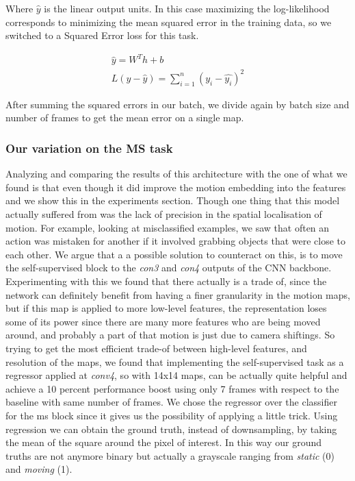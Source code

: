 \documentclass[10pt,twocolumn,hidelinks,letterpaper]{article}
\begin{document}
Where $\hat{y}$ is the linear output units. In this case maximizing the log-likelihood corresponds to minimizing the mean squared error in the training data, so we switched to a Squared Error loss for this task.

\begin{align*}
\hat{y} = W^Th + b\\
L(y - \hat{y}) = \sum_{i=1}^{n}(y_i - \hat{y_i})^2
\end{align*}

After summing the squared errors in our batch, we divide again by batch size and number of frames to get the mean error on a single map.

\subsubsection{Our variation on the MS task}

Analyzing and comparing the results of this architecture with the one of \cite{egornn} what we found is that even though it did improve the motion embedding into the features and we show this in the experiments section. Though one thing that this model actually suffered from was the lack of precision in the spatial localisation of motion. For example, looking at misclassified examples, we saw that often an action was mistaken for another if it involved grabbing objects that were close to each other. We argue that a a possible solution to counteract on this, is to move the self-supervised block to the \textit{con3} and \textit{con4} outputs of the CNN backbone. Experimenting with this we found that there actually is a trade of, since the network can definitely benefit from having a finer granularity in the motion maps, but if this map is applied to more low-level features, the representation loses some of its power since there are many more features who are being moved around, and probably a part of that motion is just due to camera shiftings. So trying to get the most efficient trade-of between high-level features, and resolution of the maps, we found that implementing the self-supervised task as a regressor applied at \textit{conv4}, so with 14x14 maps, can
be actually quite helpful and achieve a 10 percent performance boost using only 7 frames with respect to the baseline with same number of frames.
We chose the regressor over the classifier for the ms block since it gives us the possibility of applying a little trick. Using regression we can obtain the ground truth, instead of downsampling, by taking the mean of the square around the pixel of interest. In this way our ground truths are not anymore binary but actually a grayscale ranging from \textit{static} (0) and \textit{moving} (1).
\end{document}

